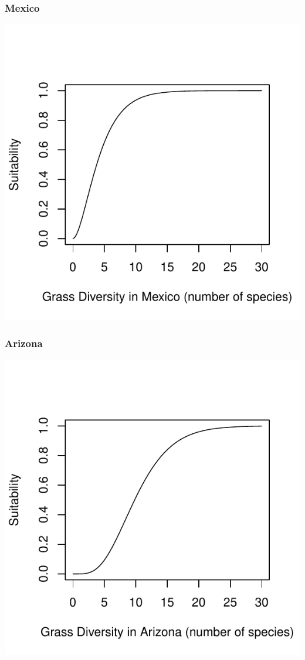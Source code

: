 \documentclass[12pt,letterpaper]{article}\usepackage{graphicx, color}
\makeatletter
\def\maxwidth{ %
  \ifdim\Gin@nat@width>\linewidth
    \linewidth
  \else
    \Gin@nat@width
  \fi
}
\newenvironment{knitrout}{}{} %
\makeatother
\begin{document}
\subsubsection{Mexico}
\begin{knitrout}
\color{fgcolor}\includegraphics[width=\maxwidth]{figure/Goodwin_Grass-Diversity_MX} 
\end{knitrout}

\subsubsection{Arizona}
\begin{knitrout}
\color{fgcolor}\includegraphics[width=\maxwidth]{figure/Goodwin_Grass-Diversity_AZ} 
\end{knitrout}
\end{document}
